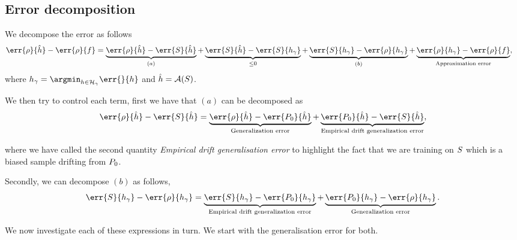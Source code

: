 \subsection{Error decomposition}
\label{sec:error-decomposition}
We decompose the error as follows
\begin{align*}
  \err{\rho}{\hat{h}} - \err{\rho}{f} & = \underbrace{\err{\rho}{\hat{h}} - \err{\trainset}{\hat{h}}}_{(a)} + \underbrace{\err{\trainset}{\hat{h}} - \err{\trainset}{h_{\gamma}}}_{\leq 0} + \underbrace{\err{\trainset}{h_{\gamma}} - \err{\rho}{h_{\gamma}}}_{(b)} + \underbrace{\err{\rho}{h_{\gamma}} - \err{\rho}{f}}_{\text{Approximation error}},
\end{align*}
where \(h_{\gamma} = \argmin_{h \in \mathcal{H}_{\gamma}} \err{}{h}\) and
\(\hat{h} = \mathcal{A}(S)\).

We then try to control each term, first we have that \((a)\) can be decomposed
as 
\begin{equation*}
  \err{\rho}{\hat{h}} - \err{\trainset}{\hat{h}} = \underbrace{\err{\rho}{\hat{h}} - \err{\poolset_0}{\hat{h}}}_{\text{Generalization error}} + \underbrace{\err{\poolset_0}{\hat{h}} - \err{\trainset}{\hat{h}}}_{\text{Empirical drift generalization error}},
\end{equation*}

where we have called the second quantity \emph{Empirical drift generalisation error} to highlight the fact that we are training on \(S\) which is a
biased sample drifting from \(P_0\).

Secondly, we can decompose \((b)\) as follows,
\begin{equation*}
  \err{\trainset}{h_{\gamma}} - \err{\rho}{h_{\gamma}} = \underbrace{\err{\trainset}{h_{\gamma}} - \err{\poolset_0}{h_{\gamma}}}_{\text{Empirical drift generalization error}} +\underbrace{\err{\poolset_0}{h_{\gamma}} - \err{\rho}{h_{\gamma}}}_{\text{Generalization error}}.
\end{equation*}

We now investigate each of these expressions in turn. We start with the
generalisation error for both.

